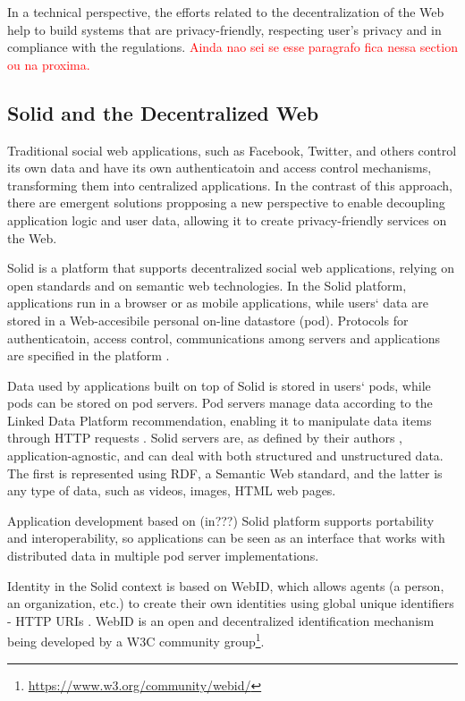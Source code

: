 \documentclass[sigconf]{acmart}
\begin{document}
In a technical perspective, the efforts related to the decentralization of the Web help to build systems that are privacy-friendly, respecting user's privacy and in compliance with the regulations.
\textcolor{red}{Ainda nao sei se esse paragrafo fica nessa section ou na proxima.}

\subsection{Solid and the Decentralized Web}
Traditional social web applications, such as Facebook, Twitter, and others control its own data and have its own authenticatoin and access control mechanisms, transforming them into centralized applications. In the contrast of this approach, there are emergent solutions propposing a new perspective to enable decoupling application logic and user data, allowing it to create privacy-friendly services on the Web.

Solid is a platform that supports decentralized social web applications, relying on open standards and on semantic web technologies. In the Solid platform, applications run in a browser or as mobile applications, while users` data are stored in a Web-accesibile personal on-line datastore (pod). Protocols for authenticatoin, access control, communications among servers and applications are specified in the platform \cite{Sambra2016}.

Data used by applications built on top of Solid is stored in users` pods, while pods can be stored on pod servers. Pod servers manage data according to the Linked Data Platform recommendation, enabling it to manipulate data items through HTTP requests \cite{LDP}. Solid servers are, as defined by their authors \cite{Sambra2016}, application-agnostic, and can deal with both structured and unstructured data. The first is represented using RDF, a Semantic Web standard, and the latter is any type of data, such as videos, images, HTML web pages.

Application development based on (in???) Solid platform supports portability and interoperability, so applications can be seen as an interface that works with distributed data in multiple pod server implementations.

Identity in the Solid context is based on WebID, which allows agents (a person, an organization, etc.) to create their own identities using global unique identifiers - HTTP URIs \cite{Sambra2016solid}. WebID is an open and decentralized identification mechanism being developed by a W3C community group\footnote{\url{https://www.w3.org/community/webid/}}.
\end{document}
